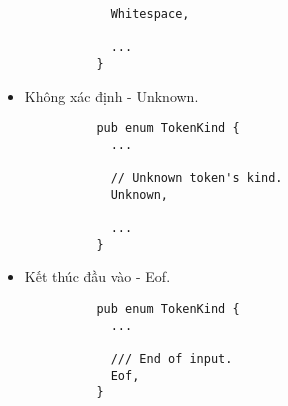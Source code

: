 \begin{itemize}
\begin{lstlisting}
            Whitespace,

            ...
          }
        \end{lstlisting}
  \item Không xác định - Unknown.
        \begin{lstlisting}
          pub enum TokenKind {
            ...
            
            // Unknown token's kind.
            Unknown,
            
            ...
          }
        \end{lstlisting}
  \item Kết thúc đầu vào - Eof.
        \begin{lstlisting}
          pub enum TokenKind {
            ...
            
            /// End of input.
            Eof,
          }
        \end{lstlisting}
\end{itemize}

